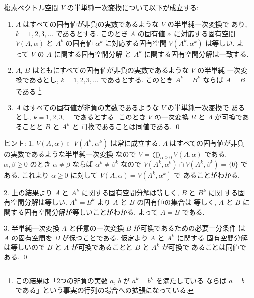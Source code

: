 \documentclass[12pt,twoside]{jarticle}
\begin{document}
\begin{question}
\label{q:semipositive-A-and-A^k}
  複素ベクトル空間 $V$ の半単純一次変換について以下が成立する:
  \begin{enumerate}
  \item $A$ はすべての固有値が非負の実数であるような $V$ の半単純一次変換で
    あり, $k=1,2,3,\ldots$ であるとする.
    このとき $A$ の固有値 $\alpha$ に対応する固有空間 $V(A,\alpha)$ 
    と $A^k$ の固有値 $\alpha^k$ に対応する固有空間 $V(A^k,\alpha^k)$ は等しい.
    よって $V$ の $A$ に関する固有空間分解
    と $A^k$ に関する固有空間分解は一致する.
  \item $A$, $B$ はともにすべての固有値が非負の実数であるような $V$ の半単純
    一次変換であるとし, $k=1,2,3,\ldots$ であるとする. 
    このとき $A^k=B^k$ ならば $A=B$ である%
    \footnote{この結果は「2つの非負の実数 $a$, $b$ が $a^k=b^k$ を満たしている
      ならば $a=b$ である」という事実の行列の場合への拡張になっている.}.
  \item $A$ はすべての固有値が非負の実数であるような $V$ の半単純一次変換で
    あるとし, $k=1,2,3,\ldots$ であるとする.
    このとき $V$ の一次変換 $B$ と $A$ が可換であることと $B$ と $A^k$ と
    可換であることは同値である.
    \qed
  \end{enumerate}
\end{question}

\noindent
ヒント: 1. $V(A,\alpha)\subset V(A^k,\alpha^k)$ は常に成立する.
$A$ はすべての固有値が非負の実数であるような半単純一次変換
なので $V=\bigoplus_{\alpha\ge 0}V(A,\alpha)$ である.
$\alpha,\beta\ge0$ のとき $\alpha\ne\beta$ ならば $\alpha^k\ne\beta^k$ 
なので $V(A^k,\alpha^k)\cap V(A^k,\beta^k)=\{0\}$ である.
これより $\alpha\ge 0$ に対して $V(A,\alpha)=V(A^k,\alpha^k)$ で
あることがわかる.

2. 上の結果より $A$ と $A^k$ に関する固有空間分解は等しく, $B$ と $B^k$ に関
する固有空間分解は等しい.  $A^k=B^k$ より $A$ と $B$ の固有値の集合は
等しく, $A$ と $B$ に関する固有空間分解が等しいことがわかる.
よって $A=B$ である.

3. 半単純一次変換 $A$ と任意の一次変換 $B$ が可換であるための必要十分条件
は $A$ の固有空間を $B$ が保つことである.  仮定より $A$ と $A^k$ に関する
固有空間分解は等しいので $B$ と $A$ が可換であることと $B$ と $A^k$ が可換で
あることは同値である.
\qed

\end{document}

